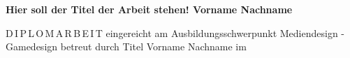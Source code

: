 \thispagestyle{totallyplain}
\begin{german}
\rule{0mm}{1mm}
\vspace*{0mm}
\begin{center}%
	\normalfont
  \setlength{\unitlength}{1cm}
	\parbox[c][5cm][c]{12cm}{\centering\LARGE\bf%
    \setlength{\baselineskip}{25pt}%
		Hier soll der Titel der Arbeit stehen!
	\vskip 15mm%
	{\large\sc Vorname Nachname}}
	\vskip 15mm%
	\makelogo%
	\vskip 15mm%
	{\Large D\,I\,P\,L\,O\,M\,A\,R\,B\,E\,I\,T}%
	\vskip 4mm%
	{\large eingereicht am} \vskip 1mm {Ausbildungsschwerpunkt \vskip 1mm Mediendesign - Gamedesign}%
	\vskip 4mm%
	\vskip 4mm%
	{\large betreut durch}%
	\vskip 1mm%
	{\large Titel Vorname Nachname}%
	\vskip 16mm%
	{\large im \monthname[\value{@abgabemonat}] }%
\end{center}%
  \vfil%
\end{german}
